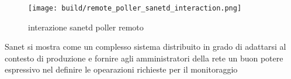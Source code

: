 \documentclass[12pt,a4paper,twoside,openright]{book}
\begin{document}
\begin{figure}[H]
    \centering
    \texttt{[image: build/remote\_poller\_sanetd\_interaction.png]}
    \caption{interazione sanetd poller remoto}
    \label{fig:enter-label}
\end{figure}

Sanet si mostra come un complesso sistema distribuito in grado di adattarsi al contesto di produzione e fornire agli amministratori della rete un buon potere espressivo nel definire le opearazioni richieste per il monitoraggio

%
%
%
%
%
%
%
%
%
\end{document}
